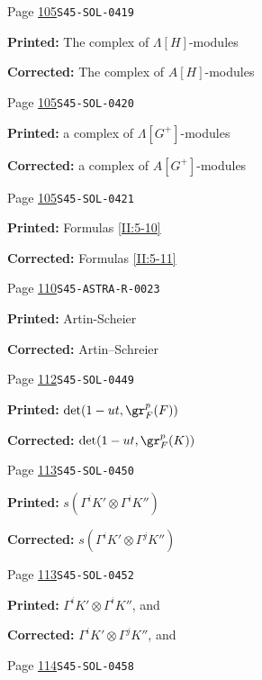 \begin{description}
\smallskip
\item[\hypertarget{apparatus:EN-0043}{43}] Page \hyperlink{printpage:en:105}{105}\quad\texttt{S45-SOL-0419}
\par\noindent\textbf{Printed:} The complex of $\Lambda[H]$-modules
\par\noindent\textbf{Corrected:} The complex of $A[H]$-modules
\smallskip
\item[\hypertarget{apparatus:EN-0044}{44}] Page \hyperlink{printpage:en:105}{105}\quad\texttt{S45-SOL-0420}
\par\noindent\textbf{Printed:} a complex of $\Lambda[G^+]$-modules
\par\noindent\textbf{Corrected:} a complex of $A[G^+]$-modules
\smallskip
\item[\hypertarget{apparatus:EN-0045}{45}] Page \hyperlink{printpage:en:105}{105}\quad\texttt{S45-SOL-0421}
\par\noindent\textbf{Printed:} Formulas \ref{II:5-10}
\par\noindent\textbf{Corrected:} Formulas \ref{II:5-11}
\smallskip
\item[\hypertarget{apparatus:EN-0046}{46}] Page \hyperlink{printpage:en:110}{110}\quad\texttt{S45-ASTRA-R-0023}
\par\noindent\textbf{Printed:} Artin-Scheier
\par\noindent\textbf{Corrected:} Artin--Schreier
\smallskip
\item[\hypertarget{apparatus:EN-0047}{47}] Page \hyperlink{printpage:en:112}{112}\quad\texttt{S45-SOL-0449}
\par\noindent\textbf{Printed:} \(\det(1-u t,\gr_F^p(F))\)
\par\noindent\textbf{Corrected:} \(\det(1-u t,\gr_F^p(K))\)
\smallskip
\item[\hypertarget{apparatus:EN-0048}{48}] Page \hyperlink{printpage:en:113}{113}\quad\texttt{S45-SOL-0450}
\par\noindent\textbf{Printed:} \(s(\Gamma^i K'\otimes \Gamma^i K'')\)
\par\noindent\textbf{Corrected:} \(s(\Gamma^i K'\otimes \Gamma^j K'')\)
\smallskip
\item[\hypertarget{apparatus:EN-0049}{49}] Page \hyperlink{printpage:en:113}{113}\quad\texttt{S45-SOL-0452}
\par\noindent\textbf{Printed:} $\Gamma^i K'\otimes \Gamma^i K''$, and
\par\noindent\textbf{Corrected:} $\Gamma^i K'\otimes \Gamma^j K''$, and
\smallskip
\item[\hypertarget{apparatus:EN-0050}{50}] Page \hyperlink{printpage:en:114}{114}\quad\texttt{S45-SOL-0458}

\end{description}
